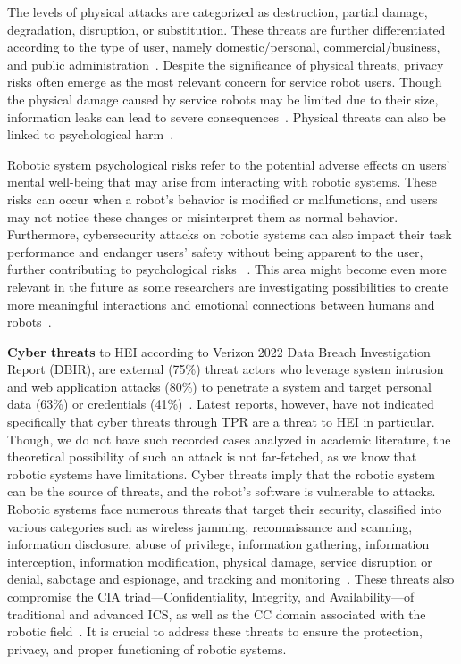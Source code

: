 The levels of physical attacks are categorized as destruction, partial damage, degradation, disruption, or substitution. These threats are
further
differentiated according to the type of user, namely domestic/personal, commercial/business, and public administration~\cite[80]{cyber_sec_robotics_privacy_safety_2017}.
Despite the significance of physical threats, privacy risks often emerge as the most relevant concern for service robot users. Though the
physical damage caused by service robots may be limited due to their size, information leaks can lead to severe consequences~\cite[83]{
  cyber_sec_robotics_privacy_safety_2017}. Physical threats can also be linked to psychological harm~\cite[5]{cyber_sec_safety_robots_legal_2021}.

Robotic system psychological risks refer to the potential adverse effects on users' mental well-being that may arise from interacting
with robotic systems. These risks can occur when a robot's behavior is modified or malfunctions, and users may not notice these
changes
or misinterpret them as normal behavior. Furthermore, cybersecurity attacks on robotic systems can also impact their task performance and
endanger users' safety without being apparent to the user, further contributing to psychological risks ~\cite[5]{
  cyber_sec_safety_robots_legal_2021}. This area might become even more relevant in the future as some researchers are investigating
possibilities to create more meaningful interactions and emotional connections between humans and robots~\cite[186]{smart_design_engineering_2020}.

\textbf{Cyber threats} to \ac{HEI} according to Verizon 2022 Data Breach Investigation Report (DBIR), are external (75\%) threat actors
who leverage system intrusion and web application attacks
(80\%) to penetrate a system and target personal data (63\%) or credentials (41\%)~\cite[57]{dbir_2022}. Latest reports, however, have not
indicated specifically that cyber threats through \ac{TPR} are a threat to \ac{HEI} in particular. Though, we do not
have such recorded cases analyzed in academic literature, the theoretical possibility of such an attack is not far-fetched, as we
know that robotic systems have limitations. Cyber threats imply that the robotic system can be the source of threats, and the robot's software is vulnerable to attacks. Robotic systems face numerous threats that target their security, classified into various categories such as wireless jamming,
reconnaissance and scanning, information disclosure, abuse of privilege, information gathering, information interception, information
modification, physical damage, service disruption or denial, sabotage and espionage, and tracking and monitoring~\cite[122]{robotics_cyber_security_2022}. These threats also
compromise the CIA triad—Confidentiality, Integrity, and Availability—of traditional and advanced \ac{ICS}, as
well as the \ac{CC} domain associated with the robotic field~\cite[116]{robotics_cyber_security_2022}. It is crucial to address these threats to ensure the protection, privacy, and proper functioning of robotic systems.

